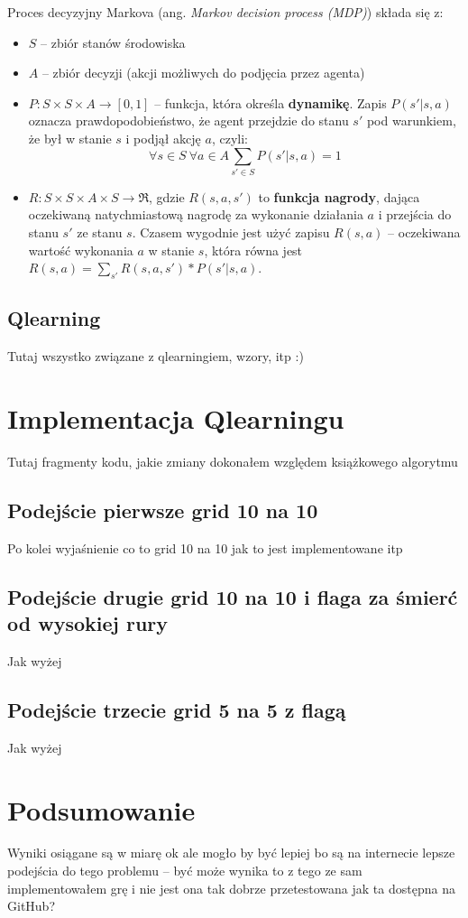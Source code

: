 \documentclass[a4paper, 12pt,oneside]{book}
\begin{document}
Proces decyzyjny Markova (ang. \textit{Markov decision process (MDP)}) składa
się z:
\begin{itemize}
		\setlength\itemsep{-0.4em}
	\item $S$ -- zbiór stanów środowiska
	\item $A$ -- zbiór decyzji (akcji możliwych do podjęcia przez agenta)
	\item $P: S\times S\times A\rightarrow [0,1]$ -- funkcja, która określa
		\textbf{dynamikę}. Zapis $P(s' | s, a)$ oznacza
		prawdopodobieństwo, że agent przejdzie do stanu $s'$ pod
		warunkiem, że był w stanie $s$ i podjął akcję $a$, czyli:
		\[\forall s\in S \ \forall a\in A \sum_{s' \in S}P(s'|s,a)=1\]
	\item $R:S\times S\times A\times S \rightarrow \mathfrak{R}$, gdzie
		$R(s,a,s')$ to \textbf{funkcja nagrody}, dająca oczekiwaną
		natychmiastową nagrodę za wykonanie działania $a$ i przejścia
		do stanu $s'$ ze stanu $s$. Czasem wygodnie jest użyć zapisu
		$R(s,a)$ -- oczekiwana wartość wykonania $a$ w stanie $s$,
		która równa jest $R(s,a)=\sum _{s'}R(s,a,s') * P(s'|s,a)$.
\end{itemize}
\section{Q\dywiz learning}
Tutaj wszystko związane z qlearningiem, wzory, itp :)

\chapter{Implementacja Q\dywiz learningu}
\label{chapter:implementacja_qlearningu}
Tutaj fragmenty kodu, jakie zmiany dokonałem względem książkowego algorytmu
\section{Podejście pierwsze grid 10 na 10}
Po kolei wyjaśnienie co to grid 10 na 10 jak to jest implementowane itp
\section{Podejście drugie grid 10 na 10 i flaga za śmierć od wysokiej rury}
Jak wyżej
\section{Podejście trzecie grid 5 na 5 z flagą}
Jak wyżej

\chapter{Podsumowanie}
Wyniki osiągane są w miarę ok ale mogło by być lepiej bo są na internecie lepsze
podejścia do tego problemu -- być może wynika to z tego ze sam implementowałem grę
i nie jest ona tak dobrze przetestowana jak ta dostępna na GitHub?
\end{document}
